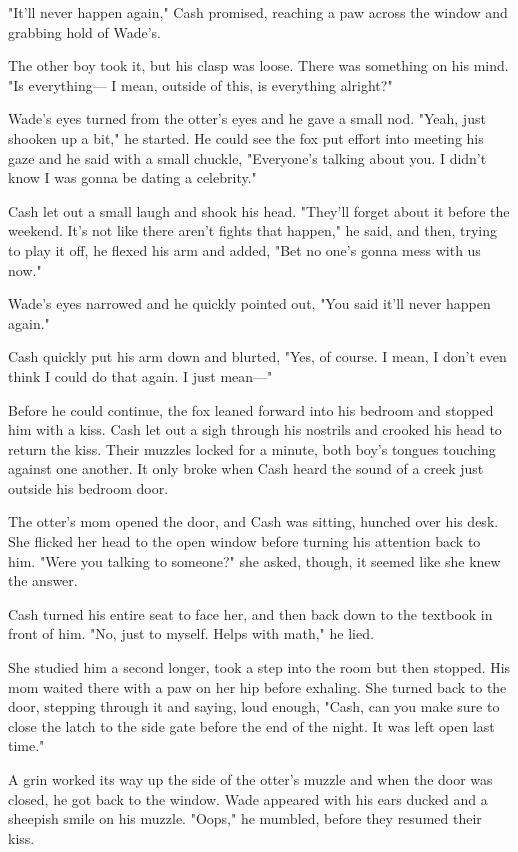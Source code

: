 "It'll never happen again," Cash promised, reaching a paw across the window and grabbing hold of Wade's.

The other boy took it, but his clasp was loose. There was something on his mind. "Is everything--- I mean, outside of this, is everything alright?"

Wade's eyes turned from the otter's eyes and he gave a small nod. "Yeah, just shooken up a bit," he started. He could see the fox put effort into meeting his gaze and he said with a small chuckle, "Everyone's talking about you. I didn't know I was gonna be dating a celebrity."

Cash let out a small laugh and shook his head. "They'll forget about it before the weekend. It's not like there aren't fights that happen," he said, and then, trying to play it off, he flexed his arm and added, "Bet no one's gonna mess with us now."

Wade's eyes narrowed and he quickly pointed out, "You said it'll never happen again."

Cash quickly put his arm down and blurted, "Yes, of course. I mean, I don't even think I could do that again. I just mean---"

Before he could continue, the fox leaned forward into his bedroom and stopped him with a kiss. Cash let out a sigh through his nostrils and crooked his head to return the kiss. Their muzzles locked for a minute, both boy's tongues touching against one another. It only broke when Cash heard the sound of a creek just outside his bedroom door.

The otter's mom opened the door, and Cash was sitting, hunched over his desk. She flicked her head to the open window before turning his attention back to him. "Were you talking to someone?" she asked, though, it seemed like she knew the answer.

Cash turned his entire seat to face her, and then back down to the textbook in front of him. "No, just to myself. Helps with math," he lied.

She studied him a second longer, took a step into the room but then stopped. His mom waited there with a paw on her hip before exhaling. She turned back to the door, stepping through it and saying, loud enough, "Cash, can you make sure to close the latch to the side gate before the end of the night. It was left open last time."

A grin worked its way up the side of the otter's muzzle and when the door was closed, he got back to the window. Wade appeared with his ears ducked and a sheepish smile on his muzzle. "Oops," he mumbled, before they resumed their kiss.

